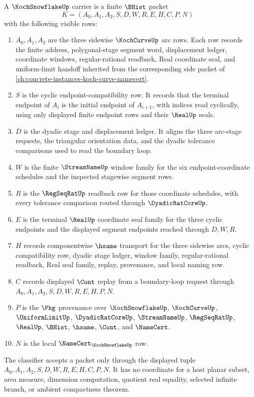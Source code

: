 \begin{definition}
\label{def:koch-snowflake-carrier}
A $\KochSnowflakeUp$ carrier is a finite $\BHist$ packet
$$
K=(A_0,A_1,A_2,S,D,W,R,E,H,C,P,N)
$$
with the following visible rows:
\begin{enumerate}
\item $A_0,A_1,A_2$ are the three sidewise $\KochCurveUp$ arc rows. Each row records the finite address, polygonal-stage segment word, displacement ledger, coordinate windows, regular-rational readback, Real coordinate seal, and uniform-limit handoff inherited from the corresponding side packet of \autoref{ch:concrete-instances-koch-curve-namecert}.
\item $S$ is the cyclic endpoint-compatibility row. It records that the terminal endpoint of $A_i$ is the initial endpoint of $A_{i+1}$, with indices read cyclically, using only displayed finite endpoint rows and their $\RealUp$ seals.
\item $D$ is the dyadic stage and displacement ledger. It aligns the three arc-stage requests, the triangular orientation data, and the dyadic tolerance comparisons used to read the boundary loop.
\item $W$ is the finite $\StreamNameUp$ window family for the six endpoint-coordinate schedules and the inspected stagewise segment rows.
\item $R$ is the $\RegSeqRatUp$ readback row for those coordinate schedules, with every tolerance comparison routed through $\DyadicRatCoreUp$.
\item $E$ is the terminal $\RealUp$ coordinate seal family for the three cyclic endpoints and the displayed segment endpoints reached through $D,W,R$.
\item $H$ records componentwise $\hsame$ transport for the three sidewise arcs, cyclic compatibility row, dyadic stage ledger, window family, regular-rational readback, Real seal family, replay, provenance, and local naming row.
\item $C$ records displayed $\Cont$ replay from a boundary-loop request through $A_0,A_1,A_2,S,D,W,R,E,H,P,N$.
\item $P$ is the $\Pkg$ provenance over $\KochSnowflakeUp$, $\KochCurveUp$, $\UniformLimitUp$, $\DyadicRatCoreUp$, $\StreamNameUp$, $\RegSeqRatUp$, $\RealUp$, $\BHist$, $\hsame$, $\Cont$, and $\NameCert$.
\item $N$ is the local $\NameCert_{\KochSnowflakeUp}$ row.
\end{enumerate}
The classifier accepts a packet only through the displayed tuple $A_0,A_1,A_2,S,D,W,R,E,H,C,P,N$. It has no coordinate for a host planar subset, area measure, dimension computation, quotient real equality, selected infinite branch, or ambient compactness theorem.
\end{definition}

